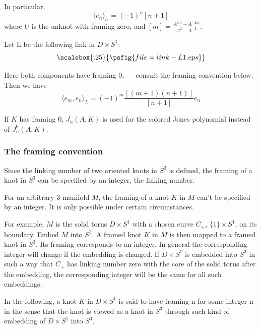  In particular,
\[\langle e_n\rangle_U=(-1)^n[n+1]\]
where $U$ is the unknot with framing zero, and $[m]=\frac{A^{2m}-A^{-2m}}{A^2-A^{-2}}$.

Let L be the following link in $D\times S^1$:
\[\scalebox{.25}{\psfig{file=link-L1.eps}}\]

Here both components have framing 0, --- consult the framing convention below. Then we have \[\langle e_m,e_n\rangle_L=(-1)^m \frac{[(m+1)(n+1)]}{[n+1]} e_n\]

If $K$ has framing 0, $J_n(A,K)$ is used for the colored Jones polynomial instead of $J_n^0(A,K)$.

\subsubsection{The framing convention}
Since the linking number of two oriented knots in $S^3$ is defined, the framing of a knot in $S^3$ can be specified by an integer,  the linking number.

For an arbitrary 3-manifold $M$, the framing of a knot $K$ in $M$ can't be specified by an integer.
It is only possible under certain circumstances.

For example, $M$
is the solid torus $D\times S^1$ with a chosen curve $C_+$,
$\{1\}\times S^1$, on its boundary. Embed $M$ into $S^3$. A
framed knot $K$ in $M$  is then mapped to a framed knot in $S^3$. Its
framing corresponds to an integer. In general the corresponding
integer will change if the embedding is changed. If $D\times S^1$ is embedded into  $S^3$ in such a way that $C_+$ has linking
number zero with the core of the solid torus after the embedding, the corresponding integer will be the same for all such embeddings.

In the following, a
knot $K$ in $D\times S^1$ is said to have framing n for some integer n in the
sense that the knot is viewed as a knot in $S^3$ through such kind
of embedding of  $D\times S^1$ into $S^3$.







